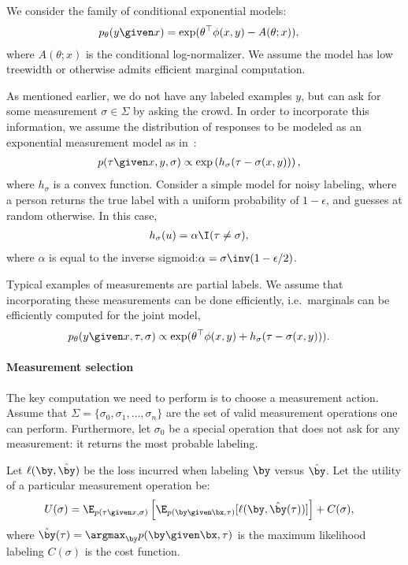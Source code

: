 We consider the family of conditional exponential models:
\begin{align*}
  p_\theta(y \given x) 
  &= \exp( \theta^\top \phi(x, y) - A(\theta; x)),
\end{align*}
where $A(\theta; x)$ is the conditional log-normalizer.
We assume the model has low treewidth or otherwise admits efficient marginal computation.

As mentioned earlier, we do not have any labeled examples $y$, but can ask for some measurement $\sigma \in \Sigma$ by asking the crowd. 
In order to incorporate this information, we assume the distribution of responses to be modeled as an exponential measurement model as in~\cite{liang09measurements}:
\begin{align*}
  p(\tau \given x, y, \sigma) 
  &\propto \exp \left( h_\sigma(\tau - \sigma(x,y)) \right),
\end{align*}
where $h_\sigma$ is a convex function.
Consider a simple model for noisy labeling, where a person returns the true label with a uniform probability of $1- \epsilon$, and guesses at random otherwise. In this case, 
\begin{align*}
  h_\sigma(u) &= \alpha \I(\tau \neq \sigma),
\end{align*}
where $\alpha$ is equal to the inverse sigmoid:$\alpha = \sigma\inv(1 - \epsilon/2)$.

Typical examples of measurements are partial labels.
We assume that incorporating these measurements can be done efficiently, i.e.\ marginals can be efficiently computed for the joint model,
\begin{align*}
  p_\theta(y \given x, \tau, \sigma) 
  &\propto \exp(\theta^\top \phi(x, y) + h_\sigma(\tau - \sigma(x,y))).
\end{align*}

\paragraph{Measurement selection}

The key computation we need to perform is to choose a measurement action.
Assume that $\Sigma = \{\sigma_0, \sigma_1, \dots, \sigma_n\}$ are the set of valid measurement operations one can perform. 
Furthermore, let $\sigma_0$ be a special operation that does not ask for any measurement: it returns the most probable  labeling.

Let $\ell(\by, \byt)$ be the loss incurred when labeling $\by$ versus $\byt$.
Let the utility of a particular measurement operation be:
\begin{align*}
U(\sigma)
&= \E_{p(\tau \given x, \sigma)} \left[
      \E_{p(\by \given \bx, \tau)}[\ell(\by, \byt(\tau))] \right] + C(\sigma),
\end{align*}
where $\byt(\tau) = \argmax_{\by} p(\by \given \bx, \tau)$ is the maximum likelihood labeling $C(\sigma)$ is the cost function.

